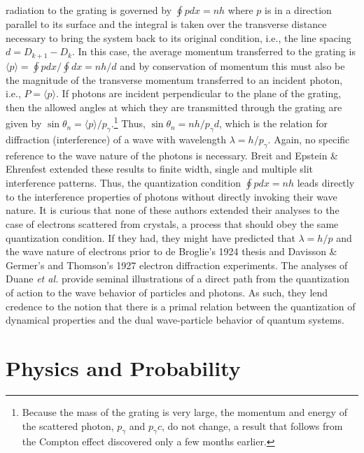 \documentclass[12pt]{article}
\begin{document}
radiation to the grating is governed by $\oint pdx=nh$ where $p$ is in a direction parallel to its surface and the integral is taken over the transverse distance necessary to bring the system back to its original condition, i.e., the line spacing $d=D_{k+1}-D_{k}$.  In this case, the average momentum transferred to the grating is $\langle p \rangle=\oint pdx/\oint dx = nh/d$ and by conservation of momentum this must also be the magnitude of the transverse momentum transferred to an incident photon, i.e., $P=\langle p \rangle$.  If photons are incident perpendicular to the plane of the grating, then the allowed angles at which they are transmitted through the grating are given by $\sin \theta_n=\langle p \rangle/p_{\gamma}$.\footnote{Because the mass of the grating is very large, the momentum and energy of the scattered photon, $p_{\gamma}$ and $p_{\gamma}c$, do not change, a result that follows from the Compton effect discovered only a few months earlier.}   Thus, $\sin \theta_n=nh/p_{\gamma}d$, which is the relation for diffraction (interference) of a wave with wavelength $\lambda=h/p_{\gamma}$.  Again, no specific reference to the wave nature of the photons is necessary.  Breit\cite{Br1923} and Epstein \& Ehrenfest\cite{Ep1924} extended these results to finite width, single and multiple slit interference patterns.  Thus, the quantization condition $\oint pdx=nh$ leads directly to the interference properties of photons without directly invoking their wave nature.  It is curious that none of these authors extended their analyses to the case of electrons scattered from crystals, a process that should obey the same quantization condition.  If they had, they might have predicted that $\lambda=h/p$ and the wave nature of electrons prior to de Broglie's 1924 thesis and Davisson \& Germer's and Thomson's 1927 electron diffraction experiments. The analyses of Duane {\it et al.} provide seminal illustrations of a direct path from the quantization of action to the wave behavior of particles and photons.  As such, they lend credence to the notion that there is a primal relation between the quantization of dynamical properties and the dual wave-particle behavior of quantum systems.

\section{Physics and Probability}\label{prob}
\end{document}
